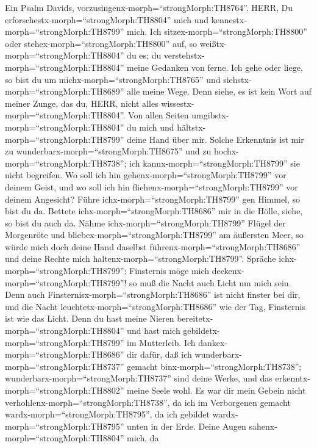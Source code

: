  Ein Psalm Davids,
vorzusingenx-morph=``strongMorph:TH8764''. HERR, Du
erforschestx-morph=``strongMorph:TH8804'' mich und
kennestx-morph=``strongMorph:TH8799'' mich.  Ich
sitzex-morph=``strongMorph:TH8800'' oder
stehex-morph=``strongMorph:TH8800'' auf, so
weißtx-morph=``strongMorph:TH8804'' du es; du
verstehstx-morph=``strongMorph:TH8804'' meine Gedanken von ferne.
 Ich gehe oder liege, so bist du um
michx-morph=``strongMorph:TH8765'' und
siehstx-morph=``strongMorph:TH8689'' alle meine Wege.  Denn
siehe, es ist kein Wort auf meiner Zunge, das du, HERR, nicht alles
wissestx-morph=``strongMorph:TH8804''.  Von allen Seiten
umgibstx-morph=``strongMorph:TH8804'' du mich und
hältstx-morph=``strongMorph:TH8799'' deine Hand über mir. 
Solche Erkenntnis ist mir zu wunderbarx-morph=``strongMorph:TH8675'' und
zu hochx-morph=``strongMorph:TH8738''; ich
kannx-morph=``strongMorph:TH8799'' sie nicht begreifen.  Wo
soll ich hin gehenx-morph=``strongMorph:TH8799'' vor deinem Geist, und
wo soll ich hin fliehenx-morph=``strongMorph:TH8799'' vor deinem
Angesicht?  Führe ichx-morph=``strongMorph:TH8799'' gen
Himmel, so bist du da. Bettete ichx-morph=``strongMorph:TH8686'' mir in
die Hölle, siehe, so bist du auch da.  Nähme
ichx-morph=``strongMorph:TH8799'' Flügel der Morgenröte und
bliebex-morph=``strongMorph:TH8799'' am äußersten Meer,  so
würde mich doch deine Hand daselbst führenx-morph=``strongMorph:TH8686''
und deine Rechte mich haltenx-morph=``strongMorph:TH8799''.
 Spräche ichx-morph=``strongMorph:TH8799'': Finsternis möge
mich deckenx-morph=``strongMorph:TH8799''! so muß die Nacht auch Licht
um mich sein.  Denn auch
Finsternisx-morph=``strongMorph:TH8686'' ist nicht finster bei dir, und
die Nacht leuchtetx-morph=``strongMorph:TH8686'' wie der Tag, Finsternis
ist wie das Licht.  Denn du hast meine Nieren
bereitetx-morph=``strongMorph:TH8804'' und hast mich
gebildetx-morph=``strongMorph:TH8799'' im Mutterleib.  Ich
dankex-morph=``strongMorph:TH8686'' dir dafür, daß ich
wunderbarx-morph=``strongMorph:TH8737'' gemacht
binx-morph=``strongMorph:TH8738'';
wunderbarx-morph=``strongMorph:TH8737'' sind deine Werke, und das
erkenntx-morph=``strongMorph:TH8802'' meine Seele wohl.  Es
war dir mein Gebein nicht verhohlenx-morph=``strongMorph:TH8738'', da
ich im Verborgenen gemacht wardx-morph=``strongMorph:TH8795'', da ich
gebildet wardx-morph=``strongMorph:TH8795'' unten in der Erde.
 Deine Augen sahenx-morph=``strongMorph:TH8804'' mich, da

